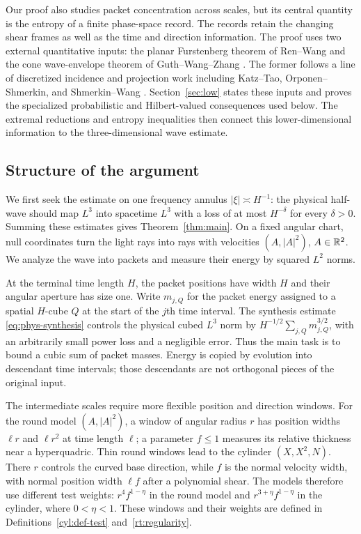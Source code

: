 Our proof also studies packet concentration across scales, but its
central quantity is the entropy of a finite phase-space record. The
records retain the changing shear frames as well as the time and
direction information. The proof uses two external quantitative inputs:
the planar Furstenberg theorem of Ren--Wang
\cite[Theorem~4.1]{RenWang2025} and the cone wave-envelope theorem of
Guth--Wang--Zhang \cite[Theorem~1.3]{GuthWangZhang2020}.
The former follows a line of discretized incidence and projection work
including Katz--Tao, Orponen--Shmerkin, and Shmerkin--Wang
\cite{KatzTao2001,OrponenShmerkin2023,ShmerkinWang2025}.
Section~\ref{sec:low} states these inputs and proves the specialized
probabilistic and Hilbert-valued consequences used below. The extremal
reductions and entropy inequalities then connect this lower-dimensional
information to the three-dimensional wave estimate.

\subsection{Structure of the argument}

We first seek the estimate on one frequency annulus
$|\xi|\asymp H^{-1}$: the physical half-wave should map $L^3$ into
spacetime $L^3$ with a loss of at most $H^{-\delta}$ for every
$\delta>0$. Summing these estimates gives Theorem~\ref{thm:main}.
On a fixed angular chart, null coordinates turn the light rays into
rays with velocities $(A,|A|^2)$, $A\in\mathbb R^2$. We analyze the wave
into packets and measure their energy by squared $L^2$ norms.

At the terminal time length $H$, the packet positions have width $H$
and their angular aperture has size one. Write $m_{j,Q}$ for the
packet energy assigned to a spatial $H$-cube $Q$ at the start of the
$j$th time interval. The synthesis estimate \eqref{eq:phys-synthesis}
controls the physical cubed $L^3$ norm by
$H^{-1/2}\sum_{j,Q}m_{j,Q}^{3/2}$, with an arbitrarily small power
loss and a negligible error. Thus the main task is to bound a cubic
sum of packet masses. Energy is copied by evolution into descendant
time intervals; those descendants are not orthogonal pieces of the
original input.

The intermediate scales require more flexible position and direction
windows. For the round model $(A,|A|^2)$, a window of angular radius
$r$ has position widths $\ell r$ and $\ell r^2$ at time length
$\ell$; a parameter $f\le1$ measures its relative thickness near a
hyperquadric. Thin round windows lead to the cylinder $(X,X^2,N)$.
There $r$ controls the curved base direction, while $f$ is the normal
velocity width, with normal position width $\ell f$ after a polynomial
shear. The models therefore use different test weights:
$r^4f^{1-\eta}$ in the round model and $r^{3+\eta}f^{1-\eta}$ in the
cylinder, where $0<\eta<1$. These windows and their weights are defined
in Definitions~\ref{cyl:def-test} and~\ref{rt:regularity}.

